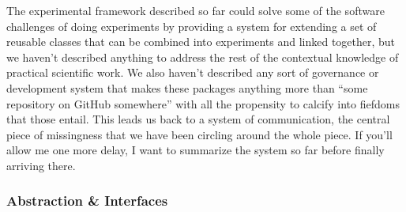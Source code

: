 \documentclass[10pt]{article}
\begin{document}
\begin{multicols}{2}
The experimental framework described so far could solve some of the
software challenges of doing experiments by providing a system for
extending a set of reusable classes that can be combined into
experiments and linked together, but we haven't described anything to
address the rest of the contextual knowledge of practical scientific
work. We also haven't described any sort of governance or development
system that makes these packages anything more than ``some repository on
GitHub somewhere'' with all the propensity to calcify into fiefdoms that
those entail. This leads us back to a system of communication, the
central piece of missingness that we have been circling around the whole
piece. If you'll allow me one more delay, I want to summarize the system
so far before finally arriving there.


\end{multicols}


\hypertarget{abstraction-interfaces}{%
\subsubsection{Abstraction \& Interfaces}\label{abstraction-interfaces}}
\end{document}
